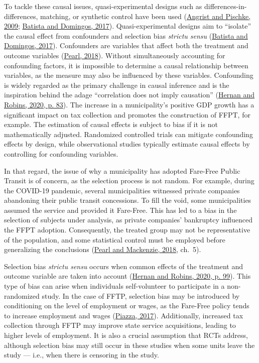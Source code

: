 \documentclass[12pt, a4paper, twoside]{article}
\numberwithin{equation}{subsection} %
\begin{document}
To tackle these causal issues, quasi-experimental designs such as
differences-in-differences, matching, or synthetic control have been
used (\protect\hyperlink{ref-mostly_harmless_econometrics}{Angrist and
Pischke, 2009}; \protect\hyperlink{ref-batista_domingos_2017}{Batista
and Domingos, 2017}). Quasi-experimental designs aim to ``isolate'' the
causal effect from confounders and selection bias \textit{strictu sensu}
(\protect\hyperlink{ref-batista_domingos_2017}{Batista and Domingos,
2017}). Confounders are variables that affect both the treatment and
outcome variables (\protect\hyperlink{ref-pearl2018}{Pearl, 2018}).
Without simultaneously accounting for confounding factors, it is
impossible to determine a causal relationship between variables, as the
measure may also be influenced by these variables. Confounding is widely
regarded as the primary challenge in causal inference and is the
inspiration behind the adage ``correlation does not imply causation''
(\protect\hyperlink{ref-Hernan2020}{Hernan and Robins, 2020, p. 83}).
The increase in a municipality's positive GDP growth has a significant
impact on tax collection and promotes the construction of FFPT, for
example. The estimation of causal effects is subject to bias if it is
not mathematically adjusted. Randomized controlled trials can mitigate
confounding effects by design, while observational studies typically
estimate causal effects by controlling for confounding variables.

In that regard, the issue of why a municipality has adopted Fare-Free
Public Transit is of concern, as the selection process is not random.
For example, during the COVID-19 pandemic, several municipalities
witnessed private companies abandoning their public transit concessions.
To fill the void, some municipalities assumed the service and provided
it Fare-Free. This has led to a bias in the selection of subjects under
analysis, as private companies' bankruptcy influenced the FFPT adoption.
Consequently, the treated group may not be representative of the
population, and some statistical control must be employed before
generalizing the conclusions
(\protect\hyperlink{ref-PearlMackenzie18}{Pearl and Mackenzie, 2018},
ch.~5).

Selection bias \textit{strictu sensu} occurs when common effects of the
treatment and outcome variable are taken into account
(\protect\hyperlink{ref-Hernan2020}{Hernan and Robins, 2020, p. 99}).
This type of bias can arise when individuals self-volunteer to
participate in a non-randomized study. In the case of FFTP, selection
bias may be introduced by conditioning on the level of employment or
wages, as the Fare-Free policy tends to increase employment and wages
(\protect\hyperlink{ref-piazza_avaliacao_2017}{Piazza, 2017}).
Additionally, increased tax collection through FFTP may improve state
service acquisitions, leading to higher levels of employment. It is also
a crucial assumption that RCTs address, although selection bias may
still occur in these studies when some units leave the study --- i.e.,
when there is censoring in the study.
\end{document}
